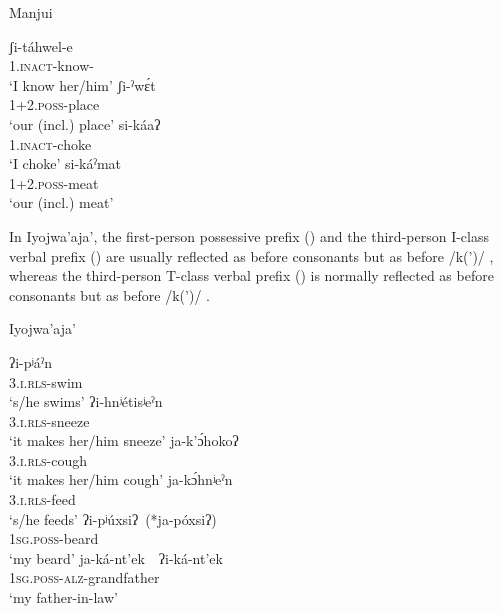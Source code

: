 \newpage
\ea\label{mj-zi-se}
Manjui \citep{JC18}
    \begin{xlist}
        \ex \gll ʃi-táhwel-e\\
            1.\textsc{inact}-know-\APPL\\
            \glt `I know her/him'
        \ex \gll ʃi-ˀwɛ́t\\
            1+2.\textsc{poss}-place\\
            \glt `our (incl.) place'
        \ex \gll si-káaʔ\\
            1.\textsc{inact}-choke\\
            \glt `I choke'
        \ex \gll si-káˀmat\\
            1+2.\textsc{poss}-meat\\
            \glt `our (incl.) meat'
    \end{xlist}
\z

In Iyojwa’aja’, the first-person possessive prefix () and the third-person I-class verbal prefix () are usually reflected as  before consonants but as  before /k(’)/ , whereas the third-person T-class verbal prefix () is normally reflected as  before consonants but as  before /k(’)/ .

\ea\label{ijw-i-ya}
Iyojwa'aja' \citep{JC14a}
    \begin{xlist}
        \ex \gll ʔi-pʲáˀn\\
            3.\textsc{i.rls}-swim\\
            \glt `s/he swims'
        \ex \gll ʔi-hnʲétisʲeˀn\\
            3.\textsc{i.rls}-sneeze\\
            \glt `it makes her/him sneeze'
        \ex \gll ja-k’ɔ́hokoʔ\\
            3.\textsc{i.rls}-cough\\
            \glt `it makes her/him cough'
        \ex \gll ja-kɔ́hnʲeˀn\\
            3.\textsc{i.rls}-feed\\
            \glt `s/he feeds'
        \ex \gll ʔi-pʲúxsiʔ~(*ja-póxsiʔ)\\
            1\textsc{sg.poss}-beard\\
            \glt `my beard'
        \ex \gll ja-ká-nt’ek~\recind~ʔi-ká-nt’ek\\
            1{\textsc{sg.poss-alz}}-grandfather\\
            \glt `my father-in-law'
    \end{xlist}
\z

